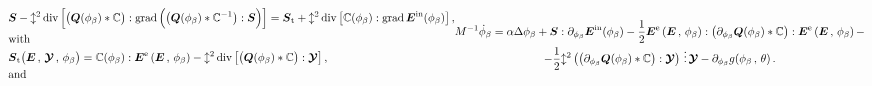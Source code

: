 \documentclass[preprint,review,3p,times,authoryear]{elsarticle}
\begin{document}
\begin{subequations}
  \begin{align}
    & \tS -  \lcorec^{2}\diver{\left[ \bigl( \tQ(\phi_{\beta})*\bbC \bigr):\grad{\Bigl( \bigl( \tQ(\phi_{\beta})*\bbC^{-1} \bigr):\tS\Bigr)} \right]} = \tSt + \lcorec^{2}\diver{\left[\bbC(\phi_{\beta}):\grad{ \tEtr }\right]}\,,\\
    &\text{with}\nonumber\\
    &\tSt\bigl( \tE\,,\, \ttY\,,\, \phi_{\beta} \bigr) = \bbC(\phi_{\beta}):\tEe - \lcorec^{2}\diver{\left[ \bigl( \tQ(\phi_{\beta})*\bbC \bigr):\ttY \right]}\,,\\
    &\text{and}\nonumber
  \end{align}
  \vspace{-6ex}
  \begin{multline}
    \label{eq:AC_equation_twin_cubic}
     M^{-1}\sdot\phi_{\beta} = \alpha\Delta\phi_{\beta} + \tS:\pder{\tEtr}{\phi_{\beta}} - \half\tEe:\bigl( \pder{\tQ(\phi_{\beta})}{\phi_{\beta}}*\bbC \bigr):\tEe -\\-  \half\lcorec^{2}\left( \bigl( \pder{\tQ(\phi_{\beta})}{\phi_{\beta}}*\bbC  \bigr):\ttY\right) \tridot \ttY - \pder{g(\phi_{\beta}\,,\,\theta)}{\phi_{\beta}}\,.
   \end{multline}
 \end{subequations}
\end{document}
